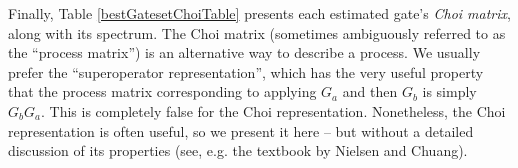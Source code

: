 \documentclass{article}[11pt]
\begin{document}




Finally, Table \ref{bestGatesetChoiTable} presents each estimated gate's \emph{Choi matrix}, along with its spectrum.  The Choi matrix (sometimes ambiguously referred to as the ``process matrix'') is an alternative way to describe a process.  We usually prefer the ``superoperator representation'', which has the very useful property that the process matrix corresponding to applying $G_a$ and then $G_b$ is simply $G_bG_a$.  This is completely false for the Choi representation.  Nonetheless, the Choi representation is often useful, so we present it here -- but without a detailed discussion of its properties (see, e.g. the textbook by Nielsen and Chuang).
\end{document}
